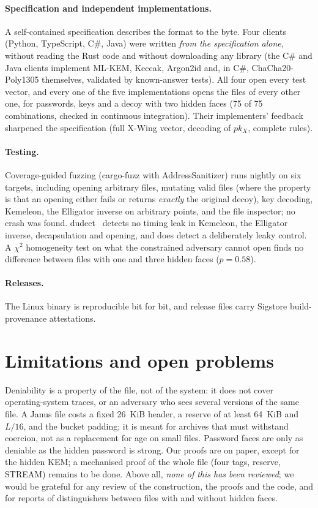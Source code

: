 \documentclass[11pt,a4paper]{article}
\theoremstyle{definition}
\theoremstyle{remark}
\begin{document}
\paragraph{Specification and independent implementations.} A self-contained specification describes the format to the byte. Four clients (Python, TypeScript, C\#, Java) were written \emph{from the specification alone}, without reading the Rust code and without downloading any library (the C\# and Java clients implement ML-KEM, Keccak, Argon2id and, in C\#, ChaCha20-Poly1305 themselves, validated by known-answer tests). All four open every test vector, and every one of the five implementations opens the files of every other one, for passwords, keys and a decoy with two hidden faces (75 of 75 combinations, checked in continuous integration). Their implementers' feedback sharpened the specification (full X-Wing vector, decoding of $pk_X$, complete rules).

\paragraph{Testing.} Coverage-guided fuzzing (cargo-fuzz with AddressSanitizer) runs nightly on six targets, including opening arbitrary files, mutating valid files (where the property is that an opening either fails or returns \emph{exactly} the original decoy), key decoding, Kemeleon, the Elligator inverse on arbitrary points, and the file inspector; no crash was found. dudect~\cite{dudect} detects no timing leak in Kemeleon, the Elligator inverse, decapsulation and opening, and does detect a deliberately leaky control. A $\chi^2$ homogeneity test on what the constrained adversary cannot open finds no difference between files with one and three hidden faces ($p = 0.58$).

\paragraph{Releases.} The Linux binary is reproducible bit for bit, and release files carry Sigstore build-provenance attestations.

\section{Limitations and open problems}
\label{sec:limits}

Deniability is a property of the file, not of the system: it does not cover operating-system traces, or an adversary who sees several versions of the same file. A Janus file costs a fixed 26~KiB header, a reserve of at least 64~KiB and $L/16$, and the bucket padding; it is meant for archives that must withstand coercion, not as a replacement for age on small files. Password faces are only as deniable as the hidden password is strong. Our proofs are on paper, except for the hidden KEM; a mechanised proof of the whole file (four tags, reserve, STREAM) remains to be done. Above all, \emph{none of this has been reviewed}; we would be grateful for any review of the construction, the proofs and the code, and for reports of distinguishers between files with and without hidden faces.
\end{document}
